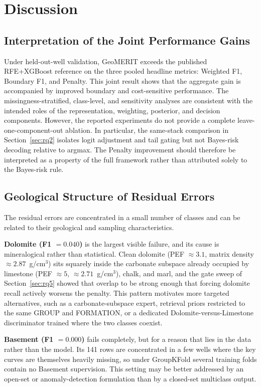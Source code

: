 \documentclass[bdcc,article,submit,pdftex,moreauthors]{Definitions/mdpi}
\begin{document}
\section{Discussion}
\label{sec:discussion}

\subsection{Interpretation of the Joint Performance Gains}
\label{sec:joint}
Under held-out-well validation, GeoMERIT exceeds the published RFE+XGBoost reference on the
three pooled headline metrics: Weighted F1, Boundary F1, and Penalty. This joint result shows
that the aggregate gain is accompanied by improved boundary and cost-sensitive performance.
The missingness-stratified, class-level, and sensitivity analyses are consistent with the
intended roles of the representation, weighting, posterior, and decision components.
However, the reported experiments do not provide a complete leave-one-component-out ablation.
In particular, the same-stack comparison in Section~\ref{sec:rq2} isolates logit adjustment
and tail gating but not Bayes-risk decoding relative to argmax. The Penalty improvement should
therefore be interpreted as a property of the full framework rather than attributed solely to
the Bayes-risk rule.

\subsection{Geological Structure of Residual Errors}
\label{sec:failures}
The residual errors are concentrated in a small number of classes and can be related to their
geological and sampling characteristics.

\textbf{Dolomite (F1 $=0.040$)} is the largest visible failure, and its cause is mineralogical
rather than statistical. Clean dolomite (PEF $\approx 3.1$, matrix density
$\approx 2.87$~g/cm$^3$) sits squarely inside the carbonate subspace already occupied by
limestone (PEF $\approx 5$, $\approx 2.71$~g/cm$^3$), chalk, and marl, and the gate sweep of
Section~\ref{sec:rq5} showed that overlap to be strong enough that forcing dolomite recall
actively worsens the penalty. This pattern motivates more targeted alternatives, such as a
carbonate-subspace expert, retrieval priors restricted to the same GROUP and FORMATION, or a
dedicated Dolomite-versus-Limestone discriminator trained where the two classes coexist.

\textbf{Basement (F1 $=0.000$)} fails completely, but for a reason that lies in the data rather
than the model. Its 141 rows are concentrated in a few wells where the key curves are
themselves heavily missing, so under GroupKFold several training folds contain no Basement
supervision. This setting may be better addressed by an open-set or anomaly-detection
formulation than by a closed-set multiclass output.
\end{document}
